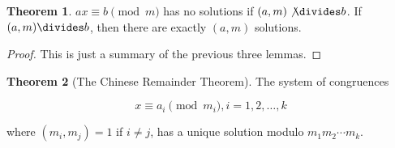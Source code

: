\documentclass{article}
\theoremstyle{definition} %
\newtheorem{theorem}{Theorem}[section] %
\theoremstyle{definition}
\theoremstyle{definition}
\theoremstyle{definition}
\begin{document}
  \begin{theorem}
    $ax \equiv b \pmod{m}$ has no solutions if $(a, m) \not\divides b$. If $(a, m) \divides b$,
    then there are exactly $(a, m)$ solutions.
  \end{theorem}
  
  \begin{proof}
    This is just a summary of the previous three lemmas.
  \end{proof}
  
  \begin{theorem}[The Chinese Remainder Theorem]
    The system of congruences
    
    \begin{equation} x \equiv a_i \pmod{m_i}, i = 1, 2, \dots, k \label{eq:chinese_remainder}\end{equation}
    
    where $(m_i, m_j) = 1$ if $i \neq j$, has a unique solution modulo $m_1m_2\cdots m_k$.
  \end{theorem}
  
\end{document}
